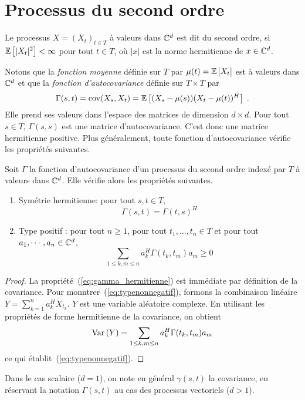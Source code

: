 \section{Processus du second ordre}
\label{sec:stat-second-ordre}


\begin{definition}
Le processus $X=(X_t)_{t \in T}$ \`a valeurs dans $\mathbb{C}^d$ est dit
du second ordre, si ${\mathbb E}\left[ |X_t|^2 \right] < \infty$ pour tout $t\in T$, o\`u $|x|$
est la norme hermitienne de $x\in \mathbb{C}^d$.
\end{definition}
Notons que la \emph{fonction moyenne} d\'efinie sur $T$ par $\mu(t)= {\mathbb E}\left[ X_t \right]$
est \`a valeurs dans $\mathbb{C}^d$ et que la \emph{fonction d'autocovariance}
d\'efinie sur $T\times T$ par
\[
\Gamma(s,t)
   = \mathrm{cov}(X_s,X_t)
   = {\mathbb E}\left[ (X_s - \mu(s))(X_t-\mu(t))^H \right]\;.
\]
Elle prend ses valeurs dans l'espace des matrices de dimension $d\times d$. Pour tout $s\in T$, $\Gamma(s,s)$ est une matrice
d'autocovariance. C'est donc une matrice hermitienne positive. Plus
g\'en\'eralement, toute fonction d'autocovariance v\'erifie les propri\'et\'es
suivantes.

\begin{proposition}
 \label{prop:positifcovgene}
 Soit $\Gamma$ la fonction d'autocovariance d'un processus du second ordre
 index\'e par $T$ \`a valeurs dans $\mathbb{C}^d$. Elle v\'erifie alors les propri\'et\'es
 suivantes.
\begin{enumerate}
\item
Sym\'etrie hermitienne: pour tout $s,t \in T$,
\begin{equation}\label{eq:gamma_hermitienne}
\Gamma(s,t)= \Gamma(t,s)^H
\end{equation}
\item Type positif :
pour tout $n\geq1$, pour tout $t_1,\dots,t_n\in T$ et pour tout
$a_1,\cdots,a_n\in\mathbb{C}^d$,
\begin{equation}
\label{eq:typenonnegatif} \sum_{1 \leq k,m \leq n} a_k^H
 \Gamma(t_k,t_m)a_m \geq 0
\end{equation}
\end{enumerate}
\end{proposition}
\begin{proof}
La propri\'et\'e~(\ref{eq:gamma_hermitienne}) est imm\'ediate par d\'efinition de la
covariance.  Pour monntrer~(\ref{eq:typenonnegatif}),
formons la combinaison lin\'eaire $Y= \sum_{k=1}^n a^H_k X_{t_k}$.
$Y$ est une variable al\'eatoire complexe. %
En utilisant les propri\'et\'es de forme hermitienne de la covariance, on obtient
\[
 \mathrm{Var}\left( Y \right)= \sum_{1 \leq k,m \leq n} a_k^H
\Gamma(t_k,t_m)a_m
\]
ce qui \'etablit~(\ref{eq:typenonnegatif}).

\end{proof}
Dans le cas scalaire ($d = 1$), on note en g\'en\'eral $\gamma(s,t)$
la covariance, en r\'eservant la notation $\Gamma(s,t)$ au cas des
processus vectoriels ($d > 1$).

